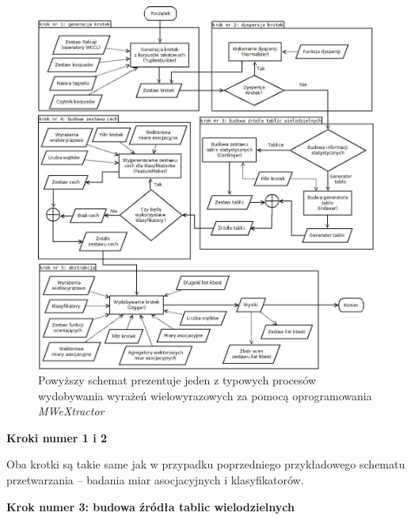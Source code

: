 \documentclass[11pt,a4paper]{llncs}
\begin{document}
\begin{figure}[h!]
\centering
\includegraphics[width=\textwidth]{charts/user_processing_scheme_extraction.jpg}
\caption [Przykładowy schemat procesu wydobywania wyrażeń wielowyrazowych]{Powyższy schemat prezentuje jeden z typowych procesów wydobywania wyrażeń wielowyrazowych za pomocą oprogramowania \emph{MWeXtractor}}
\label{user_processing_scheme_extraction}
\end{figure}


\noindent\textbf{Kroki numer 1 i 2}


Oba krotki są takie same jak w przypadku poprzedniego przykładowego schematu przetwarzania -- badania miar asocjacyjnych i klasyfikatorów.


\noindent\textbf{Krok numer 3: budowa źródła tablic wielodzielnych}
\end{document}
